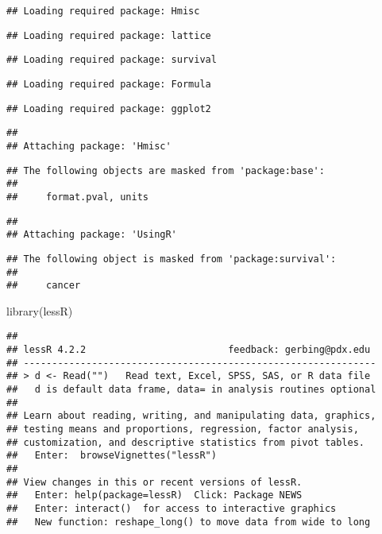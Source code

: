 \documentclass[
]{article}
\newenvironment{Shaded}{\begin{snugshade}}{\end{snugshade}}
\newcommand{\FunctionTok}[1]{\textcolor[rgb]{0.00,0.00,0.00}{#1}}
\newcommand{\NormalTok}[1]{#1}
\begin{document}
\begin{verbatim}
## Loading required package: Hmisc
\end{verbatim}

\begin{verbatim}
## Loading required package: lattice
\end{verbatim}

\begin{verbatim}
## Loading required package: survival
\end{verbatim}

\begin{verbatim}
## Loading required package: Formula
\end{verbatim}

\begin{verbatim}
## Loading required package: ggplot2
\end{verbatim}

\begin{verbatim}
## 
## Attaching package: 'Hmisc'
\end{verbatim}

\begin{verbatim}
## The following objects are masked from 'package:base':
## 
##     format.pval, units
\end{verbatim}

\begin{verbatim}
## 
## Attaching package: 'UsingR'
\end{verbatim}

\begin{verbatim}
## The following object is masked from 'package:survival':
## 
##     cancer
\end{verbatim}

\begin{Shaded}
\begin{Highlighting}[]
\FunctionTok{library}\NormalTok{(lessR)}
\end{Highlighting}
\end{Shaded}

\begin{verbatim}
## 
## lessR 4.2.2                         feedback: gerbing@pdx.edu 
## --------------------------------------------------------------
## > d <- Read("")   Read text, Excel, SPSS, SAS, or R data file
##   d is default data frame, data= in analysis routines optional
## 
## Learn about reading, writing, and manipulating data, graphics,
## testing means and proportions, regression, factor analysis,
## customization, and descriptive statistics from pivot tables.
##   Enter:  browseVignettes("lessR")
## 
## View changes in this or recent versions of lessR.
##   Enter: help(package=lessR)  Click: Package NEWS
##   Enter: interact()  for access to interactive graphics
##   New function: reshape_long() to move data from wide to long
\end{verbatim}
\end{document}
